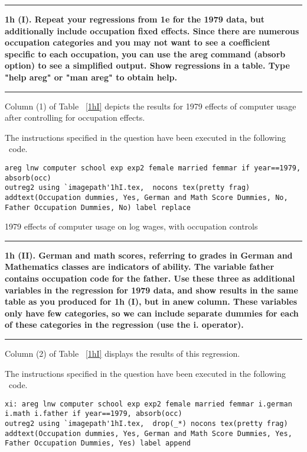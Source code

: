\documentclass[12pt]{article}
\newcommand\question[1]{\vspace{1em}\hrule\vspace{1em}\textbf{#1}\vspace{1em}\hrule\vspace{1em}}
\begin{document}
\newpage
\question{1h (I). Repeat your regressions from 1e for the 1979 data, but additionally include occupation fixed effects. Since there are numerous occupation categories and you may not want to see a coefficient specific to each occupation, you can use the areg command (absorb option) to see a simplified output. Show regressions in a table. Type "help areg" or "man areg" to obtain help.}
Column (1) of Table ~\ref{1hI} depicts the results for 1979 effects of computer usage after controlling for occupation effects.

The instructions specified in the question have been executed in the following \stata \  code.\\
\begin{lstlisting}
areg lnw computer school exp exp2 female married femmar if year==1979, absorb(occ)
outreg2 using `imagepath'1hI.tex,  nocons tex(pretty frag) addtext(Occupation dummies, Yes, German and Math Score Dummies, No, Father Occupation Dummies, No) label replace
\end{lstlisting}

\begin{table}
\caption{1979 effects of computer usage on log wages, with occupation controls}

\label{1hI}
\end{table}

\question{1h (II). German and math scores, referring to grades in German and Mathematics classes are indicators of ability. The variable father contains occupation code for the father. Use these three as additional variables in the regression for 1979 data, and show results in the same table as you produced for 1h (I), but in anew column. These variables only have few categories, so we can include separate dummies for each of these categories in the regression (use the i. operator).}
Column (2) of Table ~\ref{1hI} displays the results of this regression.

The instructions specified in the question have been executed in the following \stata \  code.\\
\begin{lstlisting}
xi: areg lnw computer school exp exp2 female married femmar i.german i.math i.father if year==1979, absorb(occ)
outreg2 using `imagepath'1hI.tex,  drop(_*) nocons tex(pretty frag) addtext(Occupation dummies, Yes, German and Math Score Dummies, Yes, Father Occupation Dummies, Yes) label append
\end{lstlisting}
\end{document}
